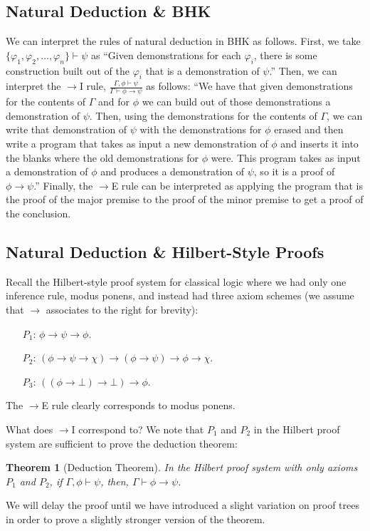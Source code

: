 \documentclass[12pt]{article}
\newtheorem{theorem}{Theorem}
\begin{document}
\subsection{Natural Deduction \& BHK}
We can interpret the rules of natural deduction in BHK as follows. First, we take $\{\varphi_1,\varphi_2,\dots,\varphi_n\}\vdash \psi$ as 
``Given demonstrations for each $\varphi_i$, there is some construction built out of the $\varphi_i$ that is a demonstration of $\psi$.''
Then, we can interpret the $\to$I rule, $\frac{\Gamma,\phi\vdash\psi}{\Gamma\vdash\phi\to\psi}$ as follows: 
``We have that given demonstrations for the contents of $\Gamma$ and for $\phi$ we can build out of those demonstrations a demonstration of $\psi$. 
Then, using the demonstrations for the contents of $\Gamma$, we can write that demonstration of $\psi$ with the demonstrations for $\phi$ erased 
and then write a program that takes as input a new demonstration of $\phi$ and inserts it into the blanks where the old demonstrations for $\phi$ were.  
This program takes as input a demonstration of $\phi$ and produces a demonstration of $\psi$, so it is a proof of $\phi\to\psi$.''
Finally, the $\to$E rule can be interpreted as applying the program that is the proof of the major premise to the proof of the minor premise 
to get a proof of the conclusion. 

\subsection{Natural Deduction \& Hilbert-Style Proofs}
Recall the Hilbert-style proof system for classical logic where we had only one inference rule, modus ponens, and instead had three axiom schemes
(we assume that $\to$ associates to the right for brevity):
\begin{itemize}
\item[$P_1$:] $\phi\to\psi\to\phi$. 
\item[$P_2$:] $(\phi\to\psi\to\chi) \to (\phi\to\psi)\to\phi\to\chi$.
\item[$P_3$:] $((\phi\to\bot)\to\bot)\to\phi$. 
\end{itemize}
The $\to$E rule clearly corresponds to modus ponens. 

What does $\to$I correspond to? We note that $P_1$ and $P_2$ in the Hilbert proof system are sufficient to prove the deduction theorem: 
\begin{theorem}[Deduction Theorem]
In the Hilbert proof system with only axioms $P_1$ and $P_2$, if $\Gamma,\phi\vdash\psi$, then, $\Gamma\vdash\phi\to\psi$.
\end{theorem}
We will delay the proof until we have introduced a slight variation on proof trees in order to prove a slightly stronger version of the theorem.
 
\end{document}
